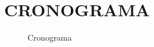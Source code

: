 
\chapter{CRONOGRAMA}
\label{chap:cronograma}

\begin{figure}[!htb]
    \centering
    \caption{Cronograma}
    \label{fig:cronograma}
\end{figure}